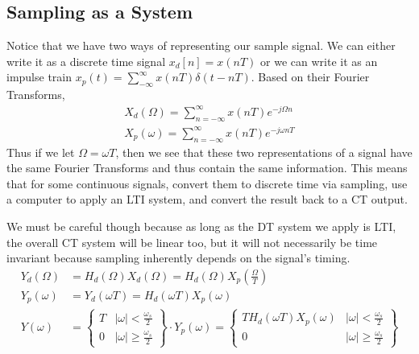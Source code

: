 \subsection{Sampling as a System}
Notice that we have two ways of representing our sample signal. We can either write it as a discrete time signal $x_d[n] = x(nT)$
or we can write it as an impulse train $x_p(t)=\sum_{-\infty}^{\infty}{x(nT)\delta(t-nT)}$.
Based on their Fourier Transforms, 
\begin{align*}
    X_d(\Omega)=\sum_{n=-\infty}^{\infty}{x(nT)e^{-j\Omega n}}\\
    X_p(\omega)=\sum_{n=-\infty}^{\infty}{x(nT)e^{-j\omega nT}}
\end{align*}
Thus if we let $\Omega=\omega T$, then we see that these two representations of a signal have the same Fourier Transforms
and thus contain the same information. This means that for some continuous signals, convert them to discrete time via sampling,
use a computer to apply an LTI system, and convert the result back to a CT output. 
\begin{gitbook-image}
\begin{figure}[H]
    \centering
\end{figure}
\end{gitbook-image}
We must be careful though because
as long as the DT system we apply is LTI, the overall CT system will be linear too, but it will not necessarily be time invariant
because sampling inherently depends on the signal's timing.
\begin{align*}
    Y_d(\Omega) &= H_d(\Omega)X_d(\Omega) = H_d(\Omega)X_p\left(\frac{\Omega}{T}\right)\\
    Y_p(\omega) &= Y_d(\omega T) = H_d(\omega T)X_p(\omega)\\
    Y(\omega) &= \left\{
        \begin{array}{cc}
            T & |\omega| < \frac{\omega_s}{2}\\
            0 & |\omega| \ge \frac{\omega_s}{2}
        \end{array}
        \right\} \cdot Y_p(\omega) = \left\{
            \begin{array}{cc}
                TH_d(\omega T)X_p(\omega) & |\omega| < \frac{\omega_s}{2}\\
                0 & |\omega| \ge \frac{\omega_s}{2}
            \end{array}
            \right\}
\end{align*}
